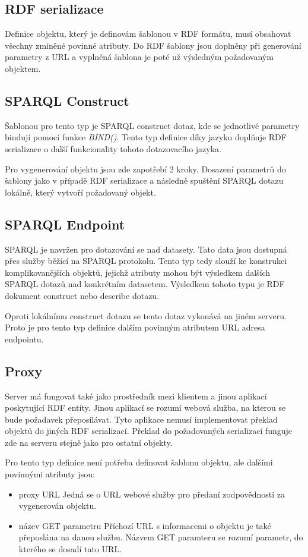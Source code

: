 \documentclass[thesis=B,czech]{FITthesis}[2012/06/26]
\begin{document}
 \subsection{RDF serializace}
   Definice objektu, který je definovám šablonou v RDF formátu, musí obsahovat všechny zmíněné povinné atributy. Do RDF šablony jsou doplněny při generování parametry z
   URL a vyplněná šablona je poté už výsledným požadovaným objektem.
 
 \subsection{SPARQL Construct}
  Šablonou pro tento typ je SPARQL construct dotaz, kde se jednotlivé parametry bindují pomocí funkce \textit{BIND()}. Tento typ definice díky jazyku 
  doplňuje RDF serializace o další funkcionality tohoto dotazovacího jazyka.
  
  Pro vygenerování objektu jsou zde zapotřebí 2 kroky. Dosazení parametrů do šablony jako v případě RDF serializace a následně spuštění SPARQL dotazu lokálně, který
  vytvoří požadovaný objekt.
  
 \subsection{SPARQL Endpoint}
  SPARQL je navržen pro dotazování se nad datasety. Tato data jsou dostupná přes služby běžící na SPARQL protokolu. Tento typ tedy slouží ke konstrukci
  komplikovanějších objektů, jejichž atributy mohou být výsledkem dalších SPARQL dotazů nad konkrétním datasetem. Výsledkem tohoto typu je RDF dokument construct
  nebo describe dotazu.
  
  Oproti lokálnímu construct dotazu se tento dotaz vykonává na jiném serveru. Proto je pro tento typ definice dalším povinným atributem URL adresa endpointu.
  
 \subsection{Proxy}
  Server má fungovat také jako prostředník mezi klientem a jinou aplikací poskytující RDF entity. Jinou aplikací se rozumí webová služba, na kterou se bude požadavek
  přeposílávat. Tyto aplikace nemusí implementovat překlad objektů do jiných RDF serializací. Překlad do požadovaných serializací funguje zde na serveru stejně jako
  pro ostatní objekty.
  
  Pro tento typ definice není potřeba definovat šablonu objektu, ale dalšími povinnými atributy jsou:
  \begin{itemize}
  \item proxy URL
    \subitem Jedná se o URL webové služby pro předaní zodpovědnosti za vygenerován objektu.
    
  \item název GET parametru
    \subitem Příchozí URL s informacemi o objektu je také přeposlána na danou službu. Názvem GET paramteru se rozumí parametr, do kterého se dosadí tato URL.
 \end{itemize}
 
\end{document}
